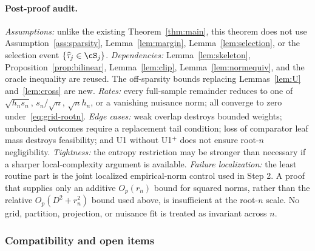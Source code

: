 \paragraph{Post-proof audit.}
\emph{Assumptions:} unlike the existing Theorem~\ref{thm:main}, this theorem
does not use Assumption~\ref{ass:sparsity}, Lemma~\ref{lem:margin},
Lemma~\ref{lem:selection}, or the selection event
$\{\widehat\tau_j\in\cS_j\}$.
\emph{Dependencies:} Lemma~\ref{lem:skeleton},
Proposition~\ref{prop:bilinear}, Lemma~\ref{lem:clip},
Lemma~\ref{lem:normequiv}, and the oracle inequality are reused.  The
off-sparsity bounds replacing Lemmas~\ref{lem:U} and~\ref{lem:cross} are new.
\emph{Rates:} every full-sample remainder reduces to one of
$\sqrt{h_ns_n}$, $s_n/\sqrt n$, $\sqrt n h_n$, or a vanishing nuisance norm;
all converge to zero under~\eqref{eq:grid-rootn}.
\emph{Edge cases:} weak overlap destroys bounded weights; unbounded outcomes
require a replacement tail condition; loss of comparator leaf mass destroys
feasibility; and U1 without U1$^+$ does not ensure root-$n$ negligibility.
\emph{Tightness:} the entropy restriction may be stronger than necessary if a
sharper local-complexity argument is available.
\emph{Failure localization:} the least routine part is the joint localized
empirical-norm control used in Step 2.  A proof that supplies only an additive
$O_p(r_n)$ bound for squared norms, rather than the relative
$O_p(D^2+r_n^2)$ bound used above, is insufficient at the root-$n$ scale.
No grid, partition, projection, or nuisance fit is treated as invariant across
$n$.

\subsubsection*{Compatibility and open items}

